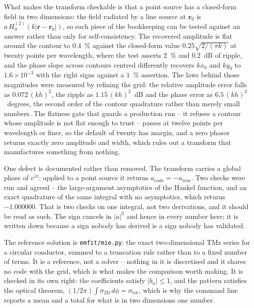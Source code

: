 What makes the transform checkable is that a point source has a closed-form field in two dimensions: the field
radiated by a line source at $\mathbf{r}_0$ is $a\,H_0^{(2)}(k\lvert\mathbf{r}-\mathbf{r}_0\rvert)$, so each
piece of the bookkeeping can be tested against an answer rather than only for self-consistency. The recovered
amplitude is flat around the contour to $0.4$~\% against the closed-form value $0.25\sqrt{2/(\pi k)}$ at
twenty points per wavelength, where the test asserts $2$~\% and $0.2$~dB of ripple, and the phase slope across
contours centred differently recovers $kx_0$ and $ky_0$ to $1.6\times10^{-3}$ with the right signs against a
$1$~\% assertion. The laws behind those magnitudes were measured by refining the grid: the relative amplitude
error falls as $0.072\,(kh)^2$, the ripple as $1.15\,(kh)^2$~dB and the phase error as $6.5\,(kh)^2$~degrees,
the second order of the contour quadrature rather than merely small numbers. The flatness gate that guards a
production run -- it refuses a contour whose amplitude is not flat enough to trust -- passes at twelve points
per wavelength or finer, so the default of twenty has margin, and a zero phasor returns exactly zero amplitude
and width, which rules out a transform that manufactures something from nothing.

One defect is documented rather than removed. The transform carries a global phase of $e^{i\pi}$: applied to
a point source it returns $a_{\mathrm{code}}=-a_{\mathrm{true}}$. Two checks were run and agreed -- the
large-argument asymptotics of the Hankel function, and an exact quadrature of the same integral with no
asymptotics, which returns $-1.000000$. That is two checks on one integral, not two derivations, and it
should be read as such. The sign cancels in $\lvert a\rvert^2$ and hence in every number here; it is written
down because a sign nobody has derived is a sign nobody has validated.

The reference solution is \texttt{emfit/mie.py}: the exact two-dimensional TMz series for a circular
conductor, summed to a truncation rule rather than to a fixed number of terms. It is a reference, not a
solver -- nothing in it is discretised and it shares no code with the grid, which is what makes the comparison
worth making. It is checked in its own right: the coefficients satisfy $\lvert b_n\rvert\le 1$, and the pattern
satisfies the optical theorem, $(1/2\pi)\int\sigma_{2\mathrm{D}}\,d\phi = \sigma_{\mathrm{tot}}$, which is
why the command line reports a mean and a total for what is in two dimensions one number.

